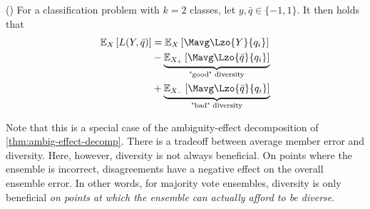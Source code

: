 \documentclass[../main.tex]{subfiles}
\begin{document}
\begin{corollary} (\cite{brown_GoodBadDiversity_2010})
    \label{thm:good-bad-diversity}
For a classification problem with $k=2$ classes, let $y, \bar{q} \in \{ -1, 1 \}$. It then holds that
\begin{align*}
\mathbb{E}_{X}\left[   L(Y, \bar{q}) \right] 
&= 
\mathbb{E}_{X}\left[    \Mavg \Lzo{Y}{q_{i}}  \right] \\
&- 
\underbrace{
\mathbb{E}_{X_{+}}\left[ \Mavg \Lzo{\bar{q}}{q_{i}} \right]  
}_{\text{"good" diversity}} \\
&+ 
\underbrace{
\mathbb{E}_{X_{-}}\left[ \Mavg \Lzo{\bar{q}}{q_{i}} \right] 
}_{\text{"bad" diversity}}
\end{align*}
\end{corollary}


Note that this is a special case of the ambiguity-effect decomposition of \cref{thm:ambig-effect-decomp}.
There is a tradeoff between average member error and diversity. Here, however, diversity is not always beneficial. On points where the ensemble is incorrect, disagreements have a negative effect on the overall ensemble error.
In other words, for majority vote ensembles, diversity is only beneficial \textit{on points at which the ensemble can actually afford to be diverse}. 
\end{document}
